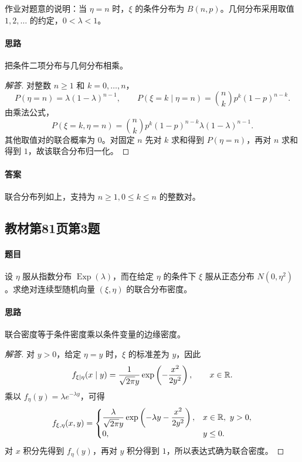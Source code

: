 作业对题意的说明：当 $\eta=n$ 时，$\xi$ 的条件分布为 $B(n,p)$。几何分布采用取值 $1,2,\ldots$ 的约定，$0<\lambda<1$。
\paragraph{思路}把条件二项分布与几何分布相乘。
\begin{proof}[解答]
对整数 $n\geq1$ 和 $k=0,\ldots,n$，
\[
P(\eta=n)=\lambda(1-\lambda)^{n-1},\qquad
P(\xi=k\mid\eta=n)=\binom nkp^k(1-p)^{n-k}.
\]
由乘法公式，
\[
P(\xi=k,\eta=n)=\binom nkp^k(1-p)^{n-k}\lambda(1-\lambda)^{n-1}.
\]
其他取值对的联合概率为 $0$。对固定 $n$ 先对 $k$ 求和得到 $P(\eta=n)$，再对 $n$ 求和得到 $1$，故该联合分布归一化。
\end{proof}
\paragraph{答案}联合分布列如上，支持为 $n\geq1,0\leq k\leq n$ 的整数对。

\subsection{教材第81页第3题}\label{ex:w11-b81-3}
\paragraph{题目}
设 $\eta$ 服从指数分布 $\operatorname{Exp}(\lambda)$，而在给定 $\eta$ 的条件下 $\xi$ 服从正态分布 $N(0,\eta^2)$。求绝对连续型随机向量 $(\xi,\eta)$ 的联合分布密度。
\paragraph{思路}联合密度等于条件密度乘以条件变量的边缘密度。
\begin{proof}[解答]
对 $y>0$，给定 $\eta=y$ 时，$\xi$ 的标准差为 $y$，因此
\[
f_{\xi\mid\eta}(x\mid y)=\frac1{\sqrt{2\pi}y}
\exp\left(-\frac{x^2}{2y^2}\right),\qquad x\in\mathbb R.
\]
乘以 $f_\eta(y)=\lambda e^{-\lambda y}$，可得
\[
f_{\xi,\eta}(x,y)=
\begin{cases}
\dfrac{\lambda}{\sqrt{2\pi}y}
\exp\left(-\lambda y-\dfrac{x^2}{2y^2}\right),&x\in\mathbb R,\ y>0,\\
0,&y\leq0.
\end{cases}
\]
对 $x$ 积分先得到 $f_\eta(y)$，再对 $y$ 积分得到 $1$，所以表达式确为联合密度。
\end{proof}
